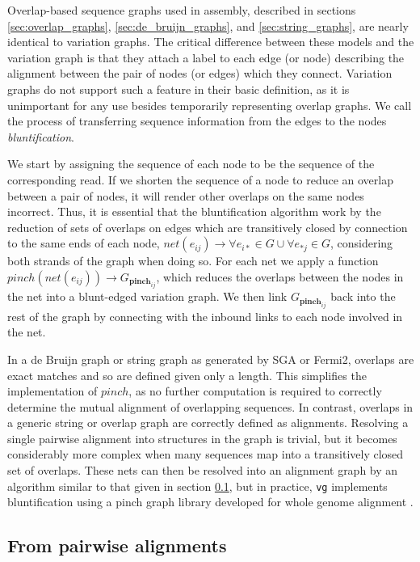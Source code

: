 \documentclass[a4paper,12pt,numbered,oneside]{Classes/PhDThesisPSnPDF}
\begin{document}
Overlap-based sequence graphs used in assembly, described in sections \ref{sec:overlap_graphs}, \ref{sec:de_bruijn_graphs}, and \ref{sec:string_graphs}, are nearly identical to variation graphs.
The critical difference between these models and the variation graph is that they attach a label to each edge (or node) describing the alignment between the pair of nodes (or edges) which they connect.
Variation graphs do not support such a feature in their basic definition, as it is unimportant for any use besides temporarily representing overlap graphs.
We call the process of transferring sequence information from the edges to the nodes \emph{bluntification}.

We start by assigning the sequence of each node to be the sequence of the corresponding read.
If we shorten the sequence of a node to reduce an overlap between a pair of nodes, it will render other overlaps on the same nodes incorrect.
Thus, it is essential that the bluntification algorithm work by the reduction of sets of overlaps on edges which are transitively closed by connection to the same ends of each node, $net(e_{ij}) \to { \forall e_{i*} \in G } \cup { \forall e_{*j} \in G }$, considering both strands of the graph when doing so.
For each net we apply a function $pinch(net(e_{ij})) \to G_{\textbf{pinch}_{ij}}$, which reduces the overlaps between the nodes in the net into a blunt-edged variation graph.
We then link $G_{\textbf{pinch}_{ij}}$ back into the rest of the graph by connecting with the inbound links to each node involved in the net.

In a de Bruijn graph or string graph as generated by SGA or Fermi2, overlaps are exact matches and so are defined given only a length.
This simplifies the implementation of $pinch$, as no further computation is required to correctly determine the mutual alignment of overlapping sequences.
In contrast, overlaps in a generic string or overlap graph are correctly defined as alignments.
Resolving a single pairwise alignment into structures in the graph is trivial, but it becomes considerably more complex when many sequences map into a transitively closed set of overlaps.
These nets can then be resolved into an alignment graph by an algorithm similar to that given in section \ref{sec:from_pairwise_alignments}, but in practice, {\tt vg} implements bluntification using a pinch graph library developed for whole genome alignment \cite{Paten:2011fva}.

\subsection{From pairwise alignments}
\label{sec:from_pairwise_alignments}
\end{document}
